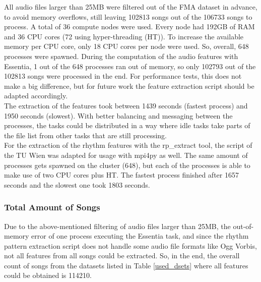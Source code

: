 \noindent All audio files larger than 25MB were filtered out of the FMA dataset in advance, to avoid memory overflows, still leaving 102813 songs out of the 106733 songs to process. A total of 36 compute nodes were used. Every node had 192GB of RAM and 36 CPU cores (72 using hyper-threading (HT)). To increase the available memory per CPU core, only 18 CPU cores per node were used. So, overall, 648 processes were spawned. During the computation of the audio features with Essentia, 1 out of the 648 processes ran out of memory, so only 102793 out of the 102813 songs were processed in the end. For performance tests, this does not make a big difference, but for future work the feature extraction script should be adapted accordingly.\\
The extraction of the features took between 1439 seconds (fastest process) and 1950 seconds (slowest). With better balancing and messaging between the processes, the tasks could be distributed in a way where idle tasks take parts of the file list from other tasks that are still processing.\\
\noindent For the extraction of the rhythm features with the rp\_extract tool, the script of the TU Wien was adapted for usage with mpi4py as well. The same amount of processes gets spawned on the cluster (648), but each of the processes is able to make use of two CPU cores plus HT. The fastest process finished after 1657 seconds and the slowest one took 1803 seconds.

\subsubsection{Total Amount of Songs}\label{totamsong}

Due to the above-mentioned filtering of audio files larger than 25MB, the out-of-memory error of one process executing the Essentia task, and since the rhythm pattern extraction script does not handle some audio file formats like Ogg Vorbis, not all features from all songs could be extracted. So, in the end, the overall count of songs from the datasets listed in Table \ref{used_dsets} where all features could be obtained is 114210.\\


